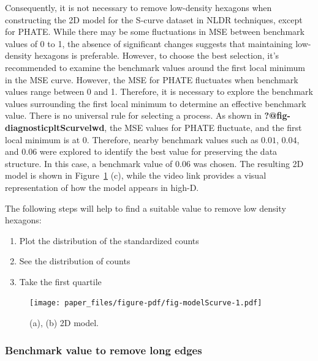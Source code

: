 \documentclass[
  12pt]{article}
\begin{document}
Consequently, it is not necessary to remove low-density hexagons when
constructing the 2D model for the S-curve dataset in NLDR techniques,
except for PHATE. While there may be some fluctuations in MSE between
benchmark values of 0 to 1, the absence of significant changes suggests
that maintaining low-density hexagons is preferable. However, to choose
the best selection, it's recommended to examine the benchmark values
around the first local minimum in the MSE curve. However, the MSE for
PHATE fluctuates when benchmark values range between 0 and 1. Therefore,
it is necessary to explore the benchmark values surrounding the first
local minimum to determine an effective benchmark value. There is no
universal rule for selecting a process. As shown in
\textbf{?@fig-diagnosticpltScurvelwd}, the MSE values for PHATE
fluctuate, and the first local minimum is at \(0\). Therefore, nearby
benchmark values such as \(0.01\), \(0.04\), and \(0.06\) were explored
to identify the best value for preserving the data structure. In this
case, a benchmark value of \(0.06\) was chosen. The resulting 2D model
is shown in Figure~\ref{fig-modelScurve} (c), while the video link
provides a visual representation of how the model appears in high-D.

The following steps will help to find a suitable value to remove low
density hexagons:

\begin{enumerate}
\def\labelenumi{\arabic{enumi}.}
\item
  Plot the distribution of the standardized counts
\item
  See the distribution of counts
\item
  Take the first quartile
\end{enumerate}

\begin{figure}

{\centering \texttt{[image: paper\_files/figure-pdf/fig-modelScurve-1.pdf]}

}

\caption{\label{fig-modelScurve}(a), (b) 2D model.}

\end{figure}

\hypertarget{benchmark-value-to-remove-long-edges}{%
\subsubsection{Benchmark value to remove long
edges}\label{benchmark-value-to-remove-long-edges}}
\end{document}
